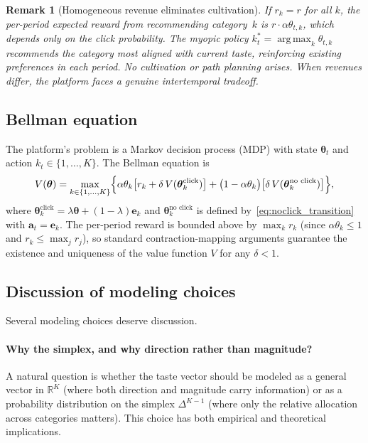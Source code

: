\documentclass[11pt]{article}
\newtheorem{remark}{Remark}
\DeclareMathOperator*{\argmax}{arg\,max}
\newcommand{\R}{\mathbb{R}}
\begin{document}
\begin{remark}[Homogeneous revenue eliminates cultivation]\label{rem:homogeneous}
If $r_k = r$ for all $k$, the per-period expected reward from recommending category~$k$ is $r \cdot \alpha \theta_{t,k}$, which depends only on the click probability. The myopic policy $k_t^* = \argmax_{k} \theta_{t,k}$ recommends the category most aligned with current taste, reinforcing existing preferences in each period. No cultivation or path planning arises. When revenues differ, the platform faces a genuine intertemporal tradeoff.
\end{remark}

\subsection{Bellman equation}

The platform's problem is a Markov decision process (MDP) with state $\boldsymbol{\theta}_t$ and action $k_t \in \{1, \ldots, K\}$. The Bellman equation is
\begin{equation}\label{eq:bellman}
V(\boldsymbol{\theta}) = \max_{k \in \{1,\ldots,K\}} \Bigl\{
\alpha \theta_k \bigl[r_k + \delta \, V(\boldsymbol{\theta}^{\text{click}}_k)\bigr]
+ \bigl(1 - \alpha \theta_k\bigr) \bigl[\delta \, V(\boldsymbol{\theta}^{\text{no click}}_k)\bigr]
\Bigr\},
\end{equation}
where $\boldsymbol{\theta}^{\text{click}}_k = \lambda \boldsymbol{\theta} + (1-\lambda)\mathbf{e}_k$ and $\boldsymbol{\theta}^{\text{no click}}_k$ is defined by~\eqref{eq:noclick_transition} with $\mathbf{a}_t = \mathbf{e}_k$. The per-period reward is bounded above by $\max_k r_k$ (since $\alpha \theta_k \le 1$ and $r_k \le \max_j r_j$), so standard contraction-mapping arguments guarantee the existence and uniqueness of the value function $V$ for any $\delta < 1$.

\subsection{Discussion of modeling choices}

Several modeling choices deserve discussion.

\paragraph{Why the simplex, and why direction rather than magnitude?} A natural question is whether the taste vector should be modeled as a general vector in $\R^K$ (where both direction and magnitude carry information) or as a probability distribution on the simplex $\Delta^{K-1}$ (where only the relative allocation across categories matters). This choice has both empirical and theoretical implications.
\end{document}
